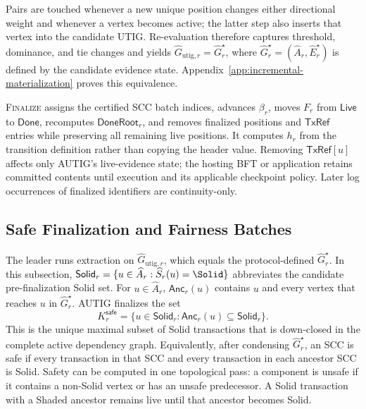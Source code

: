 Pairs are touched whenever a new unique position changes either directional weight and whenever a vertex becomes active; the latter step also inserts that vertex into the candidate UTIG.  Re-evaluation therefore captures threshold, dominance, and tie changes and yields
$\widehat G_{\mathrm{utig},r}=\widehat G_r^\star$, where
$\widehat G_r^\star=(\widehat A_r,\widehat E_r^\star)$ is defined by the candidate evidence state.  Appendix~\ref{app:incremental-materialization} proves this equivalence.

\textsc{Finalize} assigns the certified SCC batch indices, advances $\beta_r$, moves $F_r$ from $\mathsf{Live}$ to $\mathsf{Done}$, recomputes $\mathsf{DoneRoot}_r$, and removes finalized positions and $\mathsf{TxRef}$ entries while preserving all remaining live positions.  It computes $h_r$ from the transition definition rather than copying the header value. Removing $\mathsf{TxRef}[u]$ affects only AUTIG's live-evidence state; the hosting BFT or application retains committed contents until execution and its applicable checkpoint policy. Later log occurrences of finalized identifiers are continuity-only.

\subsection{Safe Finalization and Fairness Batches}
\label{sec:safe-extraction}

The leader runs extraction on $\widehat G_{\mathrm{utig},r}$, which equals the protocol-defined $\widehat G_r^\star$.  In this subsection, $\mathsf{Solid}_r=\{u\in\widehat A_r:\widehat S_r(u)=\Solid\}$ abbreviates the candidate pre-finalization Solid set.
For $u\in\widehat A_r$, $\mathsf{Anc}_r(u)$ contains $u$ and every vertex that reaches $u$ in $\widehat G_r^\star$.  AUTIG finalizes the set
\begin{equation}
 K_r^{\mathsf{safe}}
   =\{u\in\mathsf{Solid}_r:
          \mathsf{Anc}_r(u)\subseteq\mathsf{Solid}_r\}.
 \label{eq:safe-closure}
\end{equation}
This is the unique maximal subset of Solid transactions that is down-closed in the complete active dependency graph. Equivalently, after condensing $\widehat G_r^\star$, an SCC is safe if every transaction in that SCC and every transaction in each ancestor SCC is Solid.  Safety can be computed in one topological pass: a component is unsafe if it contains a non-Solid vertex or
has an unsafe predecessor. A Solid transaction with a Shaded ancestor remains live until that ancestor becomes Solid.

